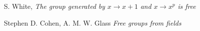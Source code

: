 \begin{thebibliography}{99}

  S. White,
  \textit{The group generated by $x \rightarrow x + 1$ and $x \rightarrow x^p$
  is free}

  Stephen D. Cohen, A. M. W. Glass
  \textit{Free groups from fields}
\end{thebibliography}
